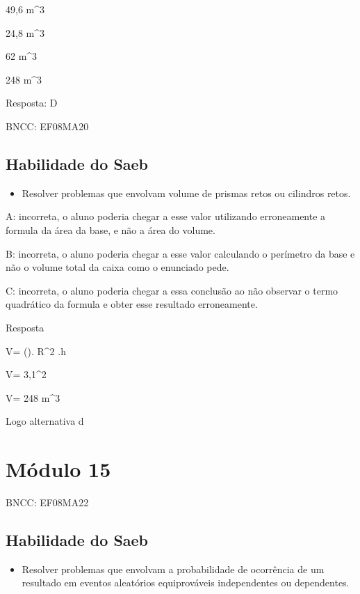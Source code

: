 \item 49,6 m^3
\item 24,8 m^3
\item 62 m^3
\item 248 m^3

Resposta: D

BNCC: EF08MA20

\section{Habilidade do Saeb}

\begin{itemize}
\tightlist

\item 
  Resolver problemas que envolvam volume de prismas retos ou cilindros
  retos.
\end{itemize}

A: incorreta, o aluno poderia chegar a esse valor utilizando
erroneamente a formula da área da base, e não a área do volume.

B: incorreta, o aluno poderia chegar a esse valor calculando o perímetro
da base e não o volume total da caixa como o enunciado pede.

C: incorreta, o aluno poderia chegar a essa conclusão ao não observar o
termo quadrático da formula e obter esse resultado erroneamente.

Resposta

V= (\Pi). R^2 .h

V= 3,1^2

V= 248 m^3

Logo alternativa d

\chapter{Módulo 15}

BNCC: EF08MA22

\section{Habilidade do Saeb}

\begin{itemize}
\tightlist

\item 
  Resolver problemas que envolvam a probabilidade de ocorrência de um
  resultado em eventos aleatórios equiprováveis independentes ou
  dependentes.
\end{itemize}


